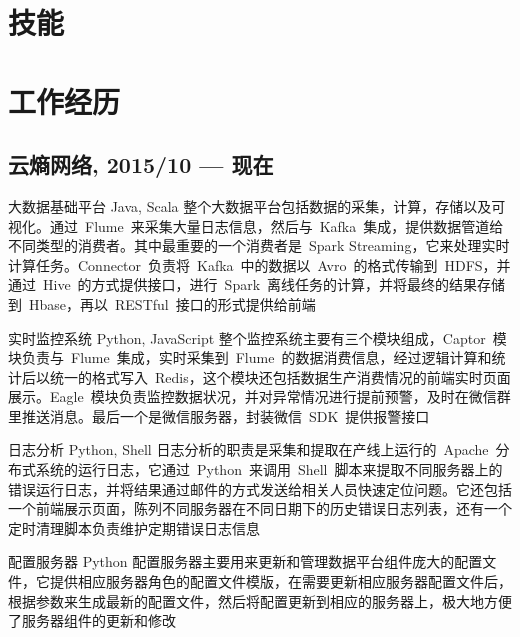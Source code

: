 \documentclass[11pt,a4paper]{moderncv}
\title{}               %
\begin{document}
\maketitle

\section{技能}

\section{工作经历}
\subsection{云熵网络, 2015/10 --- 现在}
\renewcommand{\baselinestretch}{1.0}

\cventry{}
{大数据基础平台}
{Java, Scala}
{}{}
{
整个大数据平台包括数据的采集，计算，存储以及可视化。通过~Flume~来采集大量日志信息，然后与~Kafka~集成，提供数据管道给不同类型的消费者。其中最重要的一个消费者是~Spark Streaming，它来处理实时计算任务。Connector~负责将~Kafka~中的数据以️~Avro~的格式传输到~HDFS，并通过~Hive~的方式提供接口，进行~Spark~离线任务的计算，并将最终的结果存储到~Hbase，再以~RESTful~接口的形式提供给前端
}

\vspace*{0.2\baselineskip}
\cventry{}
{实时监控系统}
{Python, JavaScript}
{}{}
{
整个监控系统主要有三个模块组成，Captor~模块负责与~Flume~集成，实时采集到~Flume~的数据消费信息，经过逻辑计算和统计后以统一的格式写入~Redis，这个模块还包括数据生产消费情况的前端实时页面展示。Eagle~模块负责监控数据状况，并对异常情况进行提前预警，及时在微信群里推送消息。最后一个是微信服务器，封装微信~SDK~提供报警接口
}

\vspace*{0.2\baselineskip}
\cventry{}
{日志分析}
{Python, Shell}
{}{}
{
日志分析的职责是采集和提取在产线上运行的~Apache~分布式系统的运行日志，它通过~Python~来调用~Shell~脚本来提取不同服务器上的错误运行日志，并将结果通过邮件的方式发送给相关人员快速定位问题。它还包括一个前端展示页面，陈列不同服务器在不同日期下的历史错误日志列表，还有一个定时清理脚本负责维护定期错误日志信息
}

\vspace*{0.2\baselineskip}
\cventry{}
{配置服务器}
{Python}
{}{}
{
配置服务器主要用来更新和管理数据平台组件庞大的配置文件，它提供相应服务器角色的配置文件模版，在需要更新相应服务器配置文件后，根据参数来生成最新的配置文件，然后将配置更新到相应的服务器上，极大地方便了服务器组件的更新和修改
}
\end{document}
